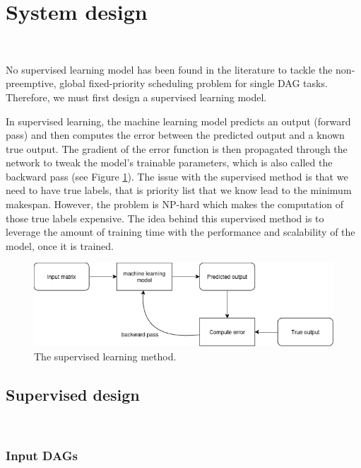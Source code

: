 \section{System design}
\label{sec:system_design}
~

No supervised learning model has been found in the literature to 
tackle the non-preemptive, global fixed-priority scheduling problem 
for single DAG tasks.
Therefore, we must first design a supervised learning model.

In supervised learning, the machine learning model 
predicts an output (forward pass) and then computes the error between
the predicted output and a known true output.
The gradient of the error function is then propagated through the network to tweak the model's 
trainable parameters, which is also called the backward pass (see Figure \ref{fig:supervised_learning}).
The issue with the supervised method is that we need to have true labels,
that is priority list that we know lead to the minimum makespan.
However, the problem is NP-hard which makes the computation
of those true labels expensive. The idea behind this supervised
method is to leverage the amount of training time with the performance
and scalability of the model, once it is trained.

\begin{figure}
    \centering
    \includegraphics[width=\linewidth]{images/supervised_learning_diagram.drawio.png}
    \caption{The supervised learning method.}
    \label{fig:supervised_learning}
\end{figure}

\subsection{Supervised design}
~

\subsubsection{Input DAGs}
~

